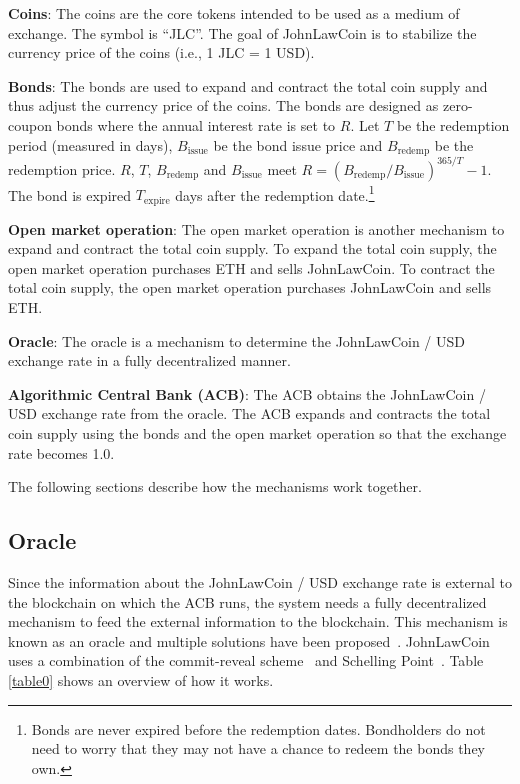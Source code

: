 \documentclass[dvipdfmx,a4paper]{article}
\begin{document}
\begin{description}
\item{\textbf{Coins}}: The coins are the core tokens intended to be used as a medium of exchange. The symbol is ``JLC''. The goal of JohnLawCoin is to stabilize the currency price of the coins (i.e., 1 JLC = 1 USD).
\item{\textbf{Bonds}}: The bonds are used to expand and contract the total coin supply and thus adjust the currency price of the coins. The bonds are designed as zero-coupon bonds where the annual interest rate is set to $R$. Let $T$ be the redemption period (measured in days), $B_{\mathrm{issue}}$ be the bond issue price and $B_{\mathrm{redemp}}$ be the redemption price. $R$, $T$, $B_{\mathrm{redemp}}$ and $B_{\mathrm{issue}}$ meet $R=(B_{\mathrm{redemp}}/B_{\mathrm{issue}})^{365/T}-1$. The bond is expired $T_{\mathrm{expire}}$ days after the redemption date.\footnote{Bonds are never expired before the redemption dates. Bondholders do not need to worry that they may not have a chance to redeem the bonds they own.}
\item{\textbf{Open market operation}}: The open market operation is another mechanism to expand and contract the total coin supply. To expand the total coin supply, the open market operation purchases ETH and sells JohnLawCoin. To contract the total coin supply, the open market operation purchases JohnLawCoin and sells ETH.
\item{\textbf{Oracle}}: The oracle is a mechanism to determine the JohnLawCoin / USD exchange rate in a fully decentralized manner.
\item{\textbf{Algorithmic Central Bank (ACB)}}: The ACB obtains the JohnLawCoin / USD exchange rate from the oracle. The ACB expands and contracts the total coin supply using the bonds and the open market operation so that the exchange rate becomes 1.0.
\end{description}

The following sections describe how the mechanisms work together.

\subsection{Oracle}

Since the information about the JohnLawCoin / USD exchange rate is external to the blockchain on which the ACB runs, the system needs a fully decentralized mechanism to feed the external information to the blockchain. This mechanism is known as an oracle and multiple solutions have been proposed~\cite{chainlink,adler2018astraea}. JohnLawCoin uses a combination of the commit-reveal scheme~\cite{wohrer2018design} and Schelling Point~\cite{shellingpoint}. Table \ref{table0} shows an overview of how it works.
\end{document}
